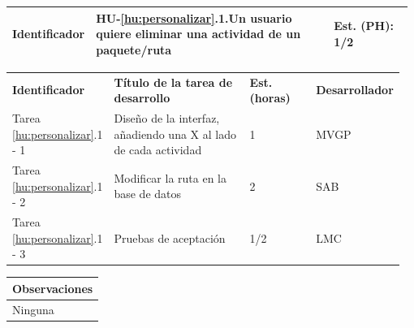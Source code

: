 \documentclass[11pt]{article}
\begin{document}
\begin{longtable}{p{0.18\linewidth}|p{0.6\linewidth}|p{0.2\linewidth}}
  \rowcolor{LightCyan}
  \textbf{Identificador} & \textbf{HU-\ref{hu:personalizar}.1}.Un usuario quiere eliminar una actividad de un paquete/ruta & \textbf{Est. (PH):} 1/2 \\
  \bottomrule
\end{longtable}
\vspace{-0.5cm}
\begin{longtable}{p{0.18\linewidth}|p{0.4\linewidth}|p{0.18\linewidth}|p{0.2\linewidth}}
  \toprule
  \textbf{Identificador} & \textbf{Título de la tarea de desarrollo} & \textbf{Est. (horas)} & \textbf{Desarrollador} \\
  Tarea \ref{hu:personalizar}.1 - 1 & Diseño de la interfaz, añadiendo una X al lado de cada actividad & 1 & MVGP\\
  Tarea \ref{hu:personalizar}.1 - 2 & Modificar la ruta en la base de datos & 2 & SAB\\
  Tarea \ref{hu:personalizar}.1 - 3 & Pruebas de aceptación & 1/2 & LMC\\
  \bottomrule
\end{longtable}
\vspace{-0.5cm}
\begin{longtable}{p{1.028\linewidth}}
  \textbf{Observaciones}\\
  \midrule
  Ninguna\\
  \bottomrule
\end{longtable}
\end{document}
